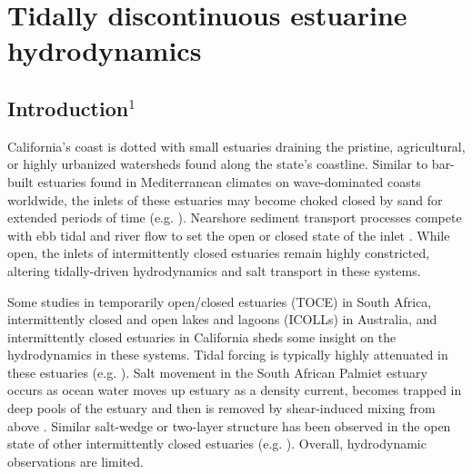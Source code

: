 \chapter{Tidally discontinuous estuarine hydrodynamics}
\label{ch3}




\section{Introduction$^1$}


California's coast is dotted with small estuaries draining the pristine,
agricultural, or highly urbanized watersheds found along the state's
coastline. Similar to bar-built estuaries found in Mediterranean climates
on wave-dominated coasts worldwide, the inlets of these estuaries
may become choked closed by sand for extended periods of time (e.g.
\cite{elwany_opening_1998,hanes_waves_2011,fortunato_morphological_2014,ranasinghe_seasonal_2003}).
Nearshore sediment transport processes compete with ebb tidal and
river flow to set the open or closed state of the inlet \parencite{behrens_episodic_2013}.
While open, the inlets of intermittently closed estuaries remain highly
constricted, altering tidally-driven hydrodynamics and salt transport
in these systems.

Some studies in temporarily open/closed estuaries (TOCE) in South
Africa, intermittently closed and open lakes and lagoons (ICOLLs)
in Australia, and intermittently closed estuaries in California sheds
some insight on the hydrodynamics in these systems. Tidal forcing
is typically highly attenuated in these estuaries (e.g. \cite{ranasinghe_circulation_1999,gale_processes_2007}).
Salt movement in the South African Palmiet estuary occurs as ocean
water moves up estuary as a density current, becomes trapped in deep
pools of the estuary and then is removed by shear-induced mixing from
above \parencite{largier_dynamics_1991}. Similar salt-wedge or two-layer
structure has been observed in the open state of other intermittently
closed estuaries (e.g. \cite{sharples_quantifying_2003}). Overall,
hydrodynamic observations are limited.

